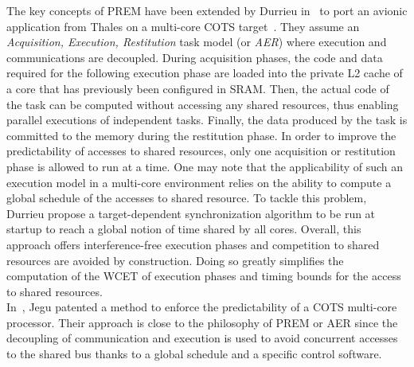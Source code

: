 \documentclass[main.tex]{subfiles}
\begin{document}
The key concepts of PREM have been extended by Durrieu \etal in~\cite{Durrieu2014} to port an avionic application from Thales on a multi-core COTS target~\cite{TMS320C6678}. They assume an \emph{Acquisition, Execution, Restitution} task model (or \emph{AER}) where execution and communications are decoupled. During acquisition phases, the code and data required for the following execution phase are loaded into the private L2 cache of a core that has previously been configured in SRAM. Then, the actual code of the task can be computed without accessing any shared resources, thus enabling parallel executions of independent tasks. Finally, the data produced by the task is committed to the memory during the restitution phase. In order to improve the predictability of accesses to shared resources, only one acquisition or restitution phase is allowed to run at a time. One may note that the applicability of such an execution model in a multi-core environment relies on the ability to compute a global schedule of the accesses to shared resource. To tackle this problem, Durrieu \etal propose a target-dependent synchronization algorithm to be run at startup to reach a global notion of time shared by all cores.
Overall, this approach offers interference-free execution phases and competition to shared resources are avoided by construction. Doing so greatly simplifies the computation of the WCET of execution phases and timing bounds for the access to shared resources. \\

In~\cite{Jegu2012}, Jegu \etal patented a method to enforce the predictability of a COTS multi-core processor. Their approach is close to the philosophy of PREM or AER since the decoupling of communication and execution is used to avoid concurrent accesses to the shared bus thanks to a global schedule and a specific control software. \\
\end{document}
